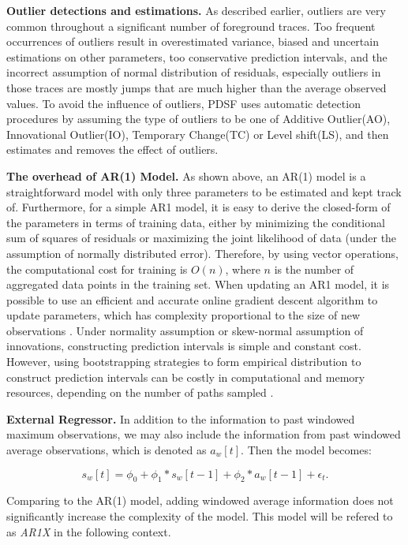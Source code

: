 \documentclass[sigplan,10pt,review,anonymous]{acmart}
\begin{document}
\textbf{Outlier detections and estimations.} As described earlier, outliers are
very common throughout a significant number of foreground traces. Too frequent
occurrences of outliers result in overestimated variance, biased and uncertain
estimations on other parameters, too conservative prediction intervals, and the
incorrect assumption of normal distribution of residuals, especially outliers in
those traces are mostly jumps that are much higher than the average observed
values. To avoid the influence of outliers, PDSF uses automatic
detection procedures \cite{10.2307/2290724} by assuming the type of outliers to
be one of Additive Outlier(AO), Innovational Outlier(IO), Temporary Change(TC)
or Level shift(LS), and then estimates and removes the effect of outliers.

\textbf{The overhead of AR(1) Model.} As shown above, an AR(1) model is a
straightforward model with only three parameters to be estimated and kept track
of. Furthermore, for a simple AR1 model, it is easy to derive the closed-form of
the parameters in terms of training data, either by minimizing the conditional
sum of squares of residuals or maximizing the joint likelihood of data (under
the assumption of normally distributed error). Therefore, by using vector
operations, the computational cost for training is $O(n)$, where $n$ is the
number of aggregated data points in the training set. When updating an AR1
model, it is possible to use an efficient and accurate online gradient descent
algorithm to update parameters, which has complexity proportional to the size of
new observations \cite{Liu2016OnlineAA}. Under normality assumption or
skew-normal assumption of innovations, constructing prediction intervals is
simple and constant cost. However, using bootstrapping strategies to form
empirical distribution to construct prediction intervals can be costly in
computational and memory resources, depending on the number of paths sampled
\cite{PAN20161}. 

\textbf{External Regressor.} In addition to the information to past windowed
maximum observations, we may also include the information from past windowed
average observations, which is denoted as $a_w[t]$. Then the model becomes:

\begin{equation}
  s_w[t] = \phi_0 + \phi_1 * s_w[t - 1] + \phi_2 * a_w[t - 1] + \epsilon_t.
\end{equation}

Comparing to the AR(1) model, adding windowed average information does not
significantly increase the complexity of the model. This model will be refered
to as \textit{AR1X} in the following context.
\end{document}
